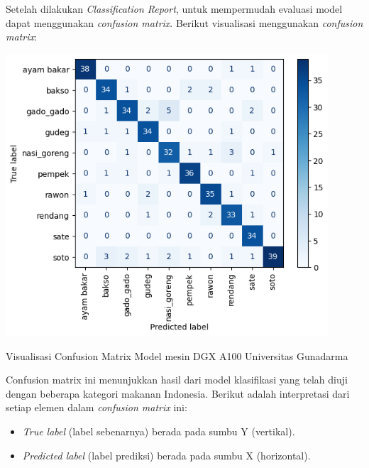 Setelah dilakukan \textit{Classification Report}, untuk mempermudah evaluasi model dapat menggunakan \textit{confusion matrix}. Berikut visualisasi menggunakan \textit{confusion matrix}:

\begin{afigure}
    \includegraphics[width=0.9\textwidth, center]{images/confussion-matrix-dgx.png}
    \caption{Visualisasi Confusion Matrix Model mesin DGX A100 Universitas Gunadarma}
    \label{fig:confussion-matrix-dgx}
\end{afigure}

Confusion matrix ini menunjukkan hasil dari model klasifikasi yang telah diuji dengan beberapa kategori makanan Indonesia. Berikut adalah interpretasi dari setiap elemen dalam \textit{confusion matrix} ini:
\begin{itemize}
    \item \textit{True label} (label sebenarnya) berada pada sumbu Y (vertikal).
    \item \textit{Predicted label} (label prediksi) berada pada sumbu X (horizontal).
\end{itemize}

